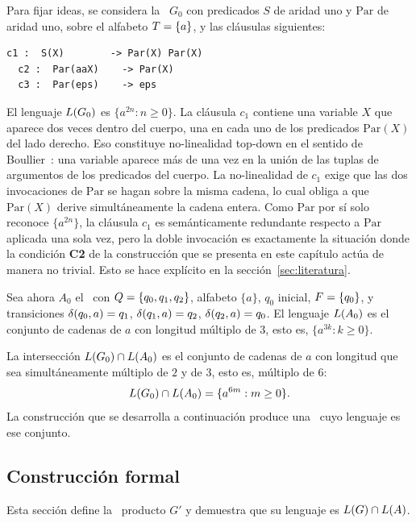 Para fijar ideas, se considera la \PRCG\ $G_0$ con predicados $S$ de aridad uno y $\mathrm{Par}$ de aridad uno, sobre el alfabeto $T = \{a\}$, y las cláusulas siguientes:

\begin{Verbatim}[xleftmargin=2em]
  c1 :  S(X)        -> Par(X) Par(X)
  c2 :  Par(aaX)    -> Par(X)
  c3 :  Par(eps)    -> eps
\end{Verbatim}

El lenguaje $L(G_0)$ es $\{ a^{2n} : n \geq 0 \}$. La cláusula $c_1$ contiene una variable $X$ que aparece dos veces dentro del cuerpo, una en cada uno de los predicados $\mathrm{Par}(X)$ del lado derecho. Eso constituye no-linealidad top-down en el sentido de Boullier~\cite{REF}: una variable aparece más de una vez en la unión de las tuplas de argumentos de los predicados del cuerpo. La no-linealidad de $c_1$ exige que las dos invocaciones de $\mathrm{Par}$ se hagan sobre la misma cadena, lo cual obliga a que $\mathrm{Par}(X)$ derive simultáneamente la cadena entera. Como $\mathrm{Par}$ por sí solo reconoce $\{a^{2n}\}$, la cláusula $c_1$ es semánticamente redundante respecto a $\mathrm{Par}$ aplicada una sola vez, pero la doble invocación es exactamente la situación donde la condición \textbf{C2} de la construcción que se presenta en este capítulo actúa de manera no trivial. Esto se hace explícito en la sección~\ref{sec:literatura}.

Sea ahora $A_0$ el \AFD\ con $Q = \{q_0, q_1, q_2\}$, alfabeto $\{a\}$, $q_0$ inicial, $F = \{q_0\}$, y transiciones $\delta(q_0, a) = q_1$, $\delta(q_1, a) = q_2$, $\delta(q_2, a) = q_0$. El lenguaje $L(A_0)$ es el conjunto de cadenas de $a$ con longitud múltiplo de $3$, esto es, $\{ a^{3k} : k \geq 0 \}$.

La intersección $L(G_0) \cap L(A_0)$ es el conjunto de cadenas de $a$ con longitud que sea simultáneamente múltiplo de $2$ y de $3$, esto es, múltiplo de $6$:
\[
L(G_0) \cap L(A_0) = \{ a^{6m} : m \geq 0 \}.
\]
La construcción que se desarrolla a continuación produce una \PRCG\ cuyo lenguaje es ese conjunto.

\subsection{Construcción formal}\label{sec:construccion}

Esta sección define la \PRCG\ producto $G'$ y demuestra que su lenguaje es $L(G) \cap L(A)$.

